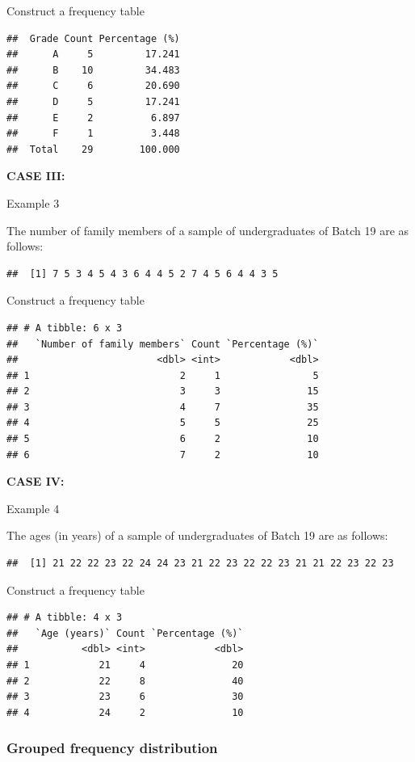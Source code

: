 \documentclass[]{book}
\begin{document}
Construct a frequency table

\begin{verbatim}
##  Grade Count Percentage (%)
##      A     5         17.241
##      B    10         34.483
##      C     6         20.690
##      D     5         17.241
##      E     2          6.897
##      F     1          3.448
##  Total    29        100.000
\end{verbatim}

\textbf{CASE III:}

Example 3

The number of family members of a sample of undergraduates of Batch 19 are as follows:

\begin{verbatim}
##  [1] 7 5 3 4 5 4 3 6 4 4 5 2 7 4 5 6 4 4 3 5
\end{verbatim}

Construct a frequency table

\begin{verbatim}
## # A tibble: 6 x 3
##   `Number of family members` Count `Percentage (%)`
##                        <dbl> <int>            <dbl>
## 1                          2     1                5
## 2                          3     3               15
## 3                          4     7               35
## 4                          5     5               25
## 5                          6     2               10
## 6                          7     2               10
\end{verbatim}

\textbf{CASE IV:}

Example 4

The ages (in years) of a sample of undergraduates of Batch 19 are as follows:

\begin{verbatim}
##  [1] 21 22 22 23 22 24 24 23 21 22 23 22 22 23 21 21 22 23 22 23
\end{verbatim}

Construct a frequency table

\begin{verbatim}
## # A tibble: 4 x 3
##   `Age (years)` Count `Percentage (%)`
##           <dbl> <int>            <dbl>
## 1            21     4               20
## 2            22     8               40
## 3            23     6               30
## 4            24     2               10
\end{verbatim}

\hypertarget{grouped-frequency-distribution}{%
\subsubsection{Grouped frequency distribution}\label{grouped-frequency-distribution}}
\end{document}
